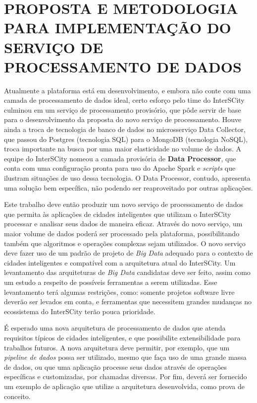 \section{PROPOSTA E METODOLOGIA PARA IMPLEMENTAÇÃO DO SERVIÇO DE PROCESSAMENTO DE DADOS}

Atualmente a plataforma está em desenvolvimento, e embora não conte
com uma camada de processamento de dados ideal, certo esforço pelo time do
InterSCity culminou em um serviço de processamento provisório, que pôde servir
de base para o desenvolvimento da proposta do novo serviço de processamento. Houve ainda a
troca de tecnologia de banco de dados no microsserviço Data Collector, que
passou do Postgres (tecnologia SQL) para o MongoDB (tecnologia NoSQL), troca
importante na busca por uma maior elasticidade no volume de dados. A equipe
do InterSCity nomeou a camada provisória de \textbf{Data Processor}, que
conta com uma configuração pronta para uso do Apache Spark e
\textit{scripts} que ilustram situações de uso dessa tecnologia. O Data
Processor, contudo, apresenta uma solução bem específica, não podendo ser
reaproveitado por outras aplicações.

Este trabalho deve então produzir um novo serviço de processamento de dados que
permita às aplicações de cidades inteligentes que utilizam o InterSCity
processar e analisar seus dados de maneira eficaz. Através do novo serviço,
um maior volume de dados poderá ser processado pela plataforma, possibilitando
também que algoritmos e operações complexas sejam utilizados. O novo serviço deve
fazer uso de um padrão de projeto de \textit{Big Data} adequado para o contexto
de cidades inteligentes e compatível com a arquitetura atual do InterSCity. Um
levantamento das arquiteturas de \textit{Big Data} candidatas deve ser feito, assim
como um estudo a respeito de possíveis ferramentas a serem utilizadas. Esse
levantamento terá algumas restrições, como: somente projetos software livre
deverão ser levados em conta, e ferramentas que necessitem grandes mudanças no
ecossistema do InterSCity terão pouca prioridade.

É esperado uma nova arquitetura de processamento de dados que atenda
requisitos típicos de cidades inteligentes, e que possibilite extensibilidade
para trabalhos futuros. A nova arquitetura deve permitir, por exemplo, que um
\textit{pipeline de dados} possa ser utilizado, mesmo que faça uso de uma
grande massa de dados, ou que uma aplicação processe seus dados através de
operações específicas e customizadas, por chamadas diversas. 
Por fim, deverá ser fornecido um exemplo de aplicação que utilize a arquitetura
desenvolvida, como prova de conceito.

